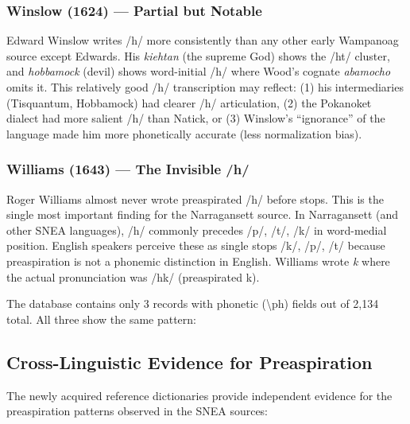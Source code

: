 \subsubsection{Winslow (1624) --- Partial but Notable}

Edward Winslow writes /h/ more consistently than any other early Wampanoag
source except Edwards. His \textit{kiehtan} (the supreme God) shows the /ht/
cluster, and \textit{hobbamock} (devil) shows word-initial /h/ where Wood's
cognate \textit{abamocho} omits it. This relatively good /h/ transcription
may reflect: (1) his intermediaries (Tisquantum, Hobbamock) had clearer /h/
articulation, (2) the Pokanoket dialect had more salient /h/ than Natick, or
(3) Winslow's ``ignorance'' of the language made him more phonetically
accurate (less normalization bias).

\subsubsection{Williams (1643) --- The Invisible /h/}

Roger Williams almost never wrote preaspirated /h/ before stops. This is the
single most important finding for the Narragansett source. In Narragansett
(and other SNEA languages), /h/ commonly precedes /p/, /t/, /k/ in
word-medial position. English speakers perceive these as single stops /k/,
/p/, /t/ because preaspiration is not a phonemic distinction in English.
Williams wrote \textit{k} where the actual pronunciation was /hk/
(preaspirated k).

The database contains only 3 records with phonetic (\textbackslash ph) fields
out of 2,134 total. All three show the same pattern:


\subsection{Cross-Linguistic Evidence for Preaspiration}

The newly acquired reference dictionaries provide independent evidence for
the preaspiration patterns observed in the SNEA sources:


